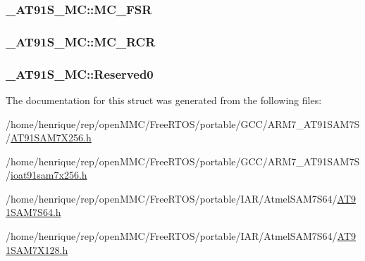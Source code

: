 \hypertarget{struct__AT91S__MC_ab2884bb7b1cbca9125cde189992a6ea7}{
\subsubsection[{M\-C\-\_\-\-F\-S\-R}]{ \-\_\-\-A\-T91\-S\-\_\-\-M\-C\-::\-M\-C\-\_\-\-F\-S\-R}}\label{struct__AT91S__MC_ab2884bb7b1cbca9125cde189992a6ea7}
\hypertarget{struct__AT91S__MC_a57612900eca5edeaf8ac6abf329b377b}{
\subsubsection[{M\-C\-\_\-\-R\-C\-R}]{ \-\_\-\-A\-T91\-S\-\_\-\-M\-C\-::\-M\-C\-\_\-\-R\-C\-R}}\label{struct__AT91S__MC_a57612900eca5edeaf8ac6abf329b377b}
\hypertarget{struct__AT91S__MC_a582ab62c12a101ecabef840aea6af54b}{
\subsubsection[{Reserved0}]{ \-\_\-\-A\-T91\-S\-\_\-\-M\-C\-::\-Reserved0}}\label{struct__AT91S__MC_a582ab62c12a101ecabef840aea6af54b}


The documentation for this struct was generated from the following files\-:\begin{DoxyCompactItemize}
\item 
/home/henrique/rep/open\-M\-M\-C/\-Free\-R\-T\-O\-S/portable/\-G\-C\-C/\-A\-R\-M7\-\_\-\-A\-T91\-S\-A\-M7\-S/\hyperlink{GCC_2ARM7__AT91SAM7S_2AT91SAM7X256_8h}{A\-T91\-S\-A\-M7\-X256.\-h}\item 
/home/henrique/rep/open\-M\-M\-C/\-Free\-R\-T\-O\-S/portable/\-G\-C\-C/\-A\-R\-M7\-\_\-\-A\-T91\-S\-A\-M7\-S/\hyperlink{ioat91sam7x256_8h}{ioat91sam7x256.\-h}\item 
/home/henrique/rep/open\-M\-M\-C/\-Free\-R\-T\-O\-S/portable/\-I\-A\-R/\-Atmel\-S\-A\-M7\-S64/\hyperlink{AT91SAM7S64_8h}{A\-T91\-S\-A\-M7\-S64.\-h}\item 
/home/henrique/rep/open\-M\-M\-C/\-Free\-R\-T\-O\-S/portable/\-I\-A\-R/\-Atmel\-S\-A\-M7\-S64/\hyperlink{AT91SAM7X128_8h}{A\-T91\-S\-A\-M7\-X128.\-h}\end{DoxyCompactItemize}
